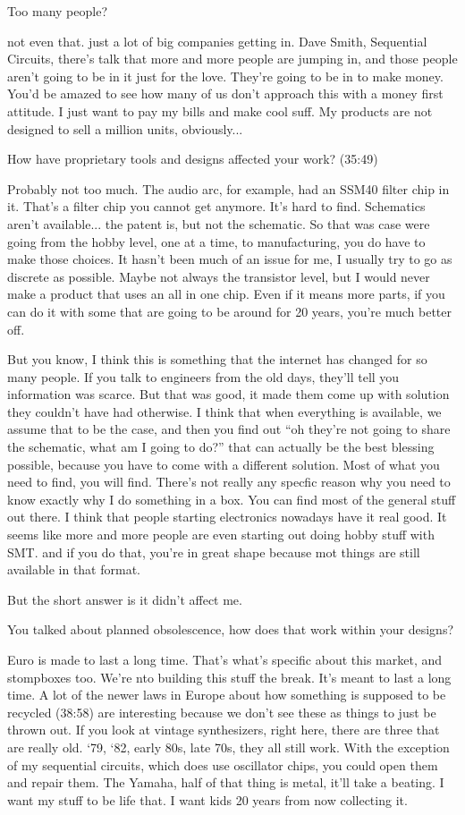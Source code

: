 Too many people? 

not even that. just a lot of big companies getting in. Dave Smith, Sequential Circuits, there's talk that more and more people are jumping in, and those people aren't going to be in it just for the love. They're going to be in to make money. You'd be amazed to see how many of us don't approach this with a money first attitude. I just want to pay my bills and make cool suff. My products are not designed to sell a million units, obviously... 

How have proprietary tools and designs affected your work? (35:49)

Probably not too much. The audio arc, for example, had an SSM40 filter chip in it. That's a filter chip you cannot get anymore. It's hard to find. Schematics aren't available... the patent is, but not the schematic. So that was case were going from the hobby level, one at a time, to manufacturing, you do have to make those choices. It hasn't been much of an issue for me, I usually try to go as discrete as possible. Maybe not always the transistor level, but I would never make a product that uses an all in one chip. Even if it means more parts, if you can do it with some that are going to be around for 20 years, you're much better off. 

But you know, I think this is something that the internet has changed for so many people. If you talk to engineers from the old days, they'll tell you information was scarce. But that was good, it made them come up with solution they couldn't have had otherwise. I think that when everything is available, we assume that to be the case, and then you find out ``oh they're not going to share the schematic, what am I going to do?'' that can actually be the best blessing possible, because you have to come with a different solution. Most of what you need to find, you will find. There's not really any specfic reason why you need to know exactly why I do something in a box. You can find most of the general stuff out there. I think that people starting electronics nowadays have it real good. It seems like more and more people are even starting out doing hobby stuff with SMT. and if you do that, you're in great shape because mot things are still available in that format. 

But the short answer is it didn't affect me. 

You talked about planned obsolescence, how does that work within your designs? 

Euro is made to last a long time. That's what's specific about this market, and stompboxes too. We're nto building this stuff the break. It's meant to last a long time. A lot of the newer laws in Europe about how something is supposed to be recycled (38:58) are interesting because we don't see these as things to just be thrown out. If you look at vintage synthesizers, right here, there are three that are really old. `79, `82, early 80s, late 70s, they all still work. With the exception of my sequential circuits, which does use oscillator chips, you could open them and repair them. The Yamaha, half of that thing is metal, it'll take a beating. I want my stuff to be life that. I want kids 20 years from now collecting it. 


